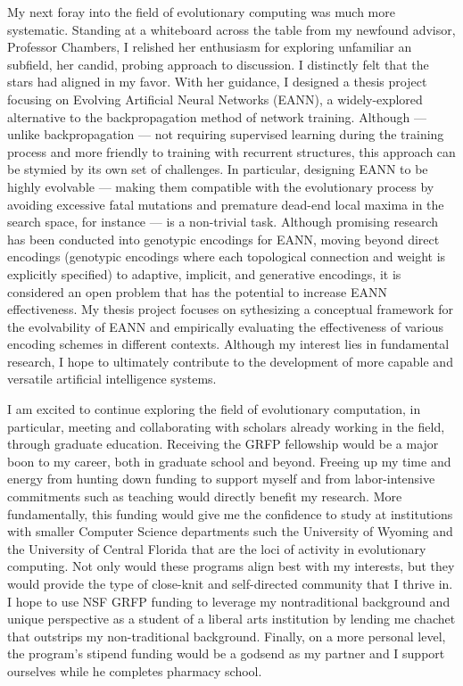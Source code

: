 \documentclass[12pt]{book}
\begin{document}
My next foray into the field of evolutionary computing was much more systematic. Standing at a whiteboard across the table from my newfound advisor, Professor Chambers, I relished her enthusiasm for exploring unfamiliar an subfield, her candid, probing approach to discussion. I distinctly felt that the stars had aligned in my favor. With her guidance, I designed a thesis project focusing on Evolving Artificial Neural Networks (EANN), a widely-explored alternative to the backpropagation method of network training. Although --- unlike backpropagation --- not requiring supervised learning during the training process and more friendly to training with recurrent structures, this approach can be stymied by its own set of challenges. In particular, designing EANN to be highly evolvable  ---  making them compatible with the evolutionary process by avoiding excessive fatal mutations and premature dead-end local maxima in the search space, for instance  ---  is a non-trivial task. Although promising research has been conducted into genotypic encodings for EANN, moving beyond direct encodings (genotypic encodings where each topological connection and weight is explicitly specified) to adaptive, implicit, and generative encodings, it is considered an open problem that has the potential to increase EANN effectiveness. My thesis project focuses on sythesizing a conceptual framework for the evolvability of EANN and empirically evaluating the effectiveness of various encoding schemes in different contexts. Although my interest lies in fundamental research, I hope to ultimately contribute to the development of more capable and versatile artificial intelligence systems.


I am excited to continue exploring the field of evolutionary computation, in particular, meeting and collaborating with scholars already working in the field, through graduate education. Receiving the GRFP fellowship would be a major boon to my career, both in graduate school and beyond. Freeing up my time and energy from hunting down funding to support myself and from labor-intensive commitments such as teaching would directly benefit my research. More fundamentally, this funding would give me the confidence to study at institutions with smaller Computer Science departments such the University of Wyoming and the University of Central Florida that are the loci of activity in evolutionary computing. Not only would these programs align best with my interests, but they would provide the type of close-knit and self-directed community that I thrive in. I hope to use NSF GRFP funding to leverage my nontraditional background and unique perspective as a student of a liberal arts institution by lending me chachet that outstrips my non-traditional background. Finally, on a more personal level, the program's stipend funding would be a godsend as my partner and I support ourselves while he completes pharmacy school.
\end{document}
